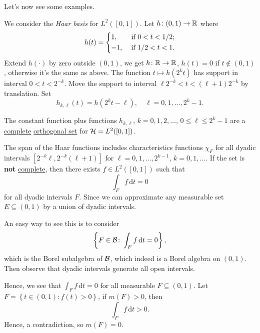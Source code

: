 Let's now see some examples.

\begin{eg}
	We consider the \emph{Haar basis} for \(L^2([0, 1])\). Let \(h\colon (0, 1)\to \mathbb{\MakeUppercase{r}} \) where
	\[
		h(t) = \begin{dcases}
			1,  & \text{ if } 0 < t < 1 / 2; \\
			-1, & \text{ if } 1 / 2 < t < 1.
		\end{dcases}
	\]
	Extend \(h(\cdot)\) by zero outside \((0, 1)\), we get \(h\colon \mathbb{\MakeUppercase{r}} \to \mathbb{\MakeUppercase{r}} \), \(h(t) = 0\) if \(t \notin (0, 1)\), otherwise it's the same as above. The function \(t\mapsto h(2^k t)\) has support in interval \(0 < t < 2^{-k}\). Move the support to interval \(\ell 2^{-k} < t < (\ell +1)2^{-k}\) by translation. Set
	\[
		h_{k, \ell }(t) = h(2^{k}t - \ell ),\quad \ell = 0, 1, \ldots , 2^k - 1.
	\]

	The constant function plus functions \(h_{k, \ell }\), \(k = 0, 1, 2, \ldots  \), \(0 \leq \ell \leq 2^k - 1\) are a \hyperref[def:complete-system]{complete} \hyperref[def:orthogonal-system]{orthogonal set} for \(\mathcal{\MakeUppercase{h}} = L^2([0, 1])\).
\end{eg}
\begin{explanation}
	The span of the Haar functions includes characteristics functions \(\chi _F\) for all dyadic intervals \([2^{-k}\ell , 2^{-k}(\ell +1)]\) for \(\ell = 0, 1, \ldots  , 2^{k-1} \), \(k = 0, 1, \ldots\). If the set is \textbf{not} \hyperref[def:complete-system]{complete}, then there exists \(f\in L^2([0, 1])\) such that
	\[
		\int _F f\,\mathrm{d} t = 0
	\]
	for all dyadic intervals \(F\). Since we can approximate any measurable set \(E\subseteq (0, 1)\) by a union of dyadic intervals.
	\begin{intuition}
		An easy way to see this is to consider
		\[
			\left\{ F\in \mathcal{\MakeUppercase{b}} \colon \int _F f\,\mathrm{d} t = 0 \right\},
		\]
		which is the Borel subalgebra of \(\mathcal{\MakeUppercase{b}} \), which indeed is a Borel algebra on \((0, 1)\). Then observe that dyadic intervals generate all open intervals.
	\end{intuition}

	Hence, we see that \(\int _F f\,\mathrm{d} t= 0\) for all measurable \(F\subseteq (0, 1)\). Let \(F = \left\{ t\in (0, 1)\colon f(t) > 0 \right\} \), if \(m(F) > 0\), then
	\[
		\int _F f\,\mathrm{d} t > 0.
	\]
	Hence, a contradiction, so \(m(F) = 0\).
\end{explanation}

